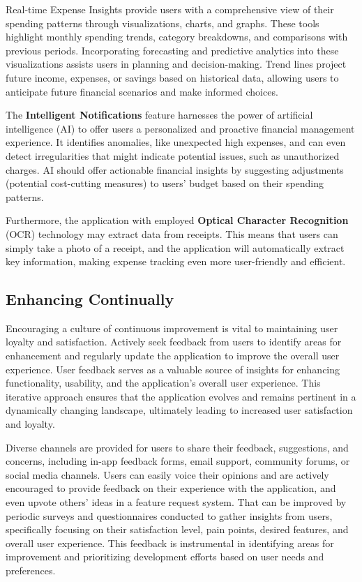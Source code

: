 Real-time Expense Insights provide users with a comprehensive view of their spending patterns through visualizations, 
charts, and graphs. These tools highlight monthly spending trends, category breakdowns, and comparisons with previous 
periods. Incorporating forecasting and predictive analytics into these visualizations assists users in planning and 
decision-making. Trend lines project future income, expenses, or savings based on historical data, allowing users to 
anticipate future financial scenarios and make informed choices.

The \textbf{Intelligent Notifications} feature harnesses the power of artificial intelligence (AI) to offer users a 
personalized and proactive financial management experience. It identifies anomalies, like unexpected high expenses, 
and can even detect irregularities that might indicate potential issues, such as unauthorized charges. AI should offer 
actionable financial insights by suggesting adjustments (potential cost-cutting measures) to users' budget based on 
their spending patterns.


Furthermore, the application with employed \textbf{Optical Character Recognition} (OCR) technology may extract data 
from receipts. This means that users can simply take a photo of a receipt, and the application will automatically 
extract key information, making expense tracking even more user-friendly and efficient.


\subsection{Enhancing Continually}

Encouraging a culture of continuous improvement is vital to maintaining user loyalty and satisfaction. Actively seek 
feedback from users to identify areas for enhancement and regularly update the application to improve the overall user 
experience. User feedback serves as a valuable source of insights for enhancing functionality, usability, and the 
application's overall user experience. This iterative approach ensures that the application evolves and remains 
pertinent in a dynamically changing landscape, ultimately leading to increased user satisfaction and loyalty.

Diverse channels are provided for users to share their feedback, suggestions, and concerns, including in-app feedback 
forms, email support, community forums, or social media channels. Users can easily voice their opinions and are 
actively encouraged to provide feedback on their experience with the application, and even upvote others' ideas in a 
feature request system. That can be improved by periodic surveys and questionnaires conducted to gather insights 
from users, specifically focusing on their satisfaction level, pain points, desired features, and overall user 
experience. This feedback is instrumental in identifying areas for improvement and prioritizing development efforts 
based on user needs and preferences.

